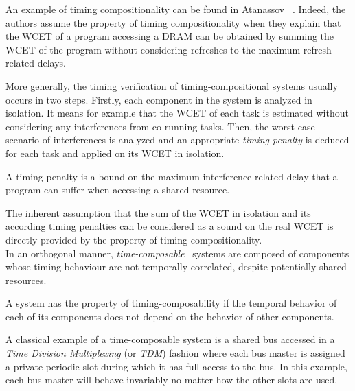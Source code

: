\documentclass[main.tex]{subfiles}
\begin{document}
An example of timing compositionality can be found in Atanassov
\etal~\cite{Atanassov2001}. Indeed, the authors assume the property of timing
compositionality when they explain that the WCET of a program accessing a DRAM
can be obtained by summing the WCET of the program without considering
refreshes to the maximum refresh-related delays.

More generally, the timing verification of timing-compositional systems usually
occurs in two steps. Firstly, each component in the system is analyzed in
isolation. It means for example that the WCET of each task is estimated without
considering any interferences from co-running tasks. Then, the worst-case
scenario of interferences is analyzed and an appropriate \emph{timing penalty}
is deduced for each task and applied on its WCET in isolation. 

\begin{definition}
A timing penalty is a bound on the maximum interference-related delay that a
    program can suffer when accessing a shared resource.
\end{definition}

The inherent assumption that the sum of the WCET in isolation and its according
timing penalties can be considered as a sound on the real WCET is directly
provided by the property of timing compositionality.\\

In an orthogonal manner, \emph{time-composable}~\cite{Hahn2015} systems are
composed of components whose timing behaviour are not temporally correlated,
despite potentially shared resources.

\begin{definition}
    \label{def_stateOfTheArt_timeComposable}
    A system has the property of timing-composability if the temporal behavior
    of each of its components does not depend on the behavior of other
    components.
\end{definition}

A classical example of a time-composable system is a shared bus accessed in a
\emph{Time Division Multiplexing} (or \emph{TDM}) fashion where each bus master
is assigned a private periodic slot during which it has full access to the bus.
In this example, each bus master will behave invariably no matter how the other
slots are used.\\
\end{document}
